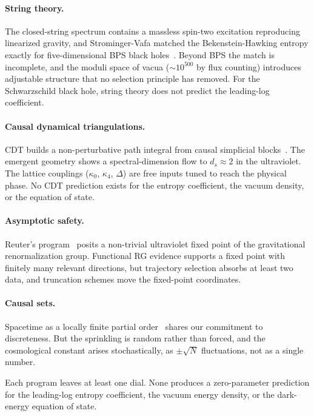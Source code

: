 \documentclass[11pt,letterpaper]{article}
\theoremstyle{definition}
\begin{document}
\paragraph{String theory.}
The closed-string spectrum contains a massless spin-two excitation
reproducing linearized gravity, and Strominger-Vafa matched the
Bekenstein-Hawking entropy exactly for five-dimensional BPS black
holes~\cite{StromingerVafa1996}.  Beyond BPS the match is incomplete,
and the moduli space of vacua ($\sim 10^{500}$ by flux counting)
introduces adjustable structure that no selection principle has
removed.  For the Schwarzschild black hole, string theory does not
predict the leading-log coefficient.

\paragraph{Causal dynamical triangulations.}
CDT builds a non-perturbative path integral from causal simplicial
blocks~\cite{AmbjornJurkiewiczLoll2004}.  The emergent geometry shows a
spectral-dimension flow to $d_s\approx 2$ in the ultraviolet.  The
lattice couplings ($\kappa_0$, $\kappa_4$, $\Delta$) are free inputs
tuned to reach the physical phase.  No CDT prediction exists for the
entropy coefficient, the vacuum density, or the equation of state.

\paragraph{Asymptotic safety.}
Reuter's program~\cite{Reuter1998} posits a non-trivial ultraviolet
fixed point of the gravitational renormalization group.  Functional RG
evidence supports a fixed point with finitely many relevant directions,
but trajectory selection absorbs at least two data, and truncation
schemes move the fixed-point coordinates.

\paragraph{Causal sets.}
Spacetime as a locally finite partial
order~\cite{BombelliLeeMeyerSorkin1987} shares our commitment to
discreteness.  But the sprinkling is random rather than forced, and the
cosmological constant arises stochastically, as $\pm\sqrt{N}$
fluctuations, not as a single number.

Each program leaves at least one dial.  None produces a zero-parameter
prediction for the leading-log entropy coefficient, the vacuum energy
density, or the dark-energy equation of state.
\end{document}
